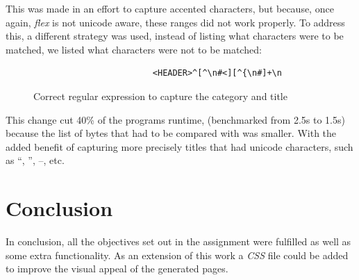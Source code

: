 \documentclass[a4paper]{article}
\begin{document}
This was made in an effort to capture accented characters, but because, once
again, \textit{flex} is not unicode aware, these ranges did not work properly.
To address this, a different strategy was used, instead of listing what
characters were to be matched, we listed what characters were not to be
matched:

\begin{figure}[H]
    \centering
    \begin{verbatim}
                        <HEADER>^[^\n#<][^{\n#]+\n
    \end{verbatim}
    \caption{Correct regular expression to capture the category and title}
\end{figure}

This change cut 40\% of the programs runtime, (benchmarked from 2.5s to 1.5s)
because the list of bytes that had to be compared with was smaller. With the
added benefit of capturing more precisely titles that had unicode characters,
such as  ``,  '', --, etc.

\section{Conclusion}

In conclusion, all the objectives set out in the assignment were fulfilled as
well as some extra functionality. As an extension of this work a \textit{CSS}
file could be added to improve the visual appeal of the generated pages.
\end{document}
